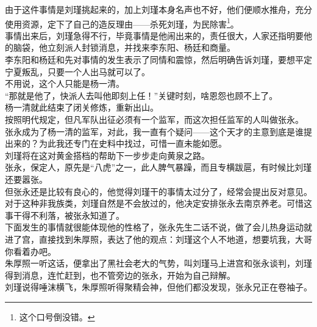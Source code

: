 \begin{multicols}{\theparacolNo}
由于这件事情是刘瑾挑起来的，加上刘瑾本身名声也不好，他们便顺水推舟，充分使用资源，定下了自己的造反理由——杀死刘瑾，为民除害\footnote{这个口号倒没错。}。\\

事情出来后，刘瑾急得不行，毕竟事情是他闹出来的，责任很大，人家还指明要他的脑袋，他立刻派人封锁消息，并找来李东阳、杨廷和商量。\\

李东阳和杨廷和先对事情的发生表示了同情和震惊，然后明确告诉刘瑾，要想平定宁夏叛乱，只要一个人出马就可以了。\\

不用说，这个人只能是杨一清。\\

“那就是他了，快派人去叫他即刻上任！”关键时刻，啥恩怨也顾不上了。\\

杨一清就此结束了闭关修炼，重新出山。\\

按照明代规定，但凡军队出征必须有一个监军，而这次担任监军的人叫做张永。\\

张永成为了杨一清的监军，对此，我一直有个疑问——这个天才的主意到底是谁提出来的？为此我还专门在史料中找过，可惜一直未能如愿。\\

刘瑾将在这对黄金搭档的帮助下一步步走向黄泉之路。\\

张永，保定人，原先是“八虎”之一，此人脾气暴躁，而且专横跋扈，有时候比刘瑾还要嚣张。\\

但张永还是比较有良心的，他觉得刘瑾干的事情太过分了，经常会提出反对意见。\\

对于这种非我族类，刘瑾自然是不会放过的，他决定安排张永去南京养老。可惜这事干得不利落，被张永知道了。\\

下面发生的事情就很能体现他的性格了，张永先生二话不说，做了会儿热身运动就进了宫，直接找到朱厚照，表达了他的观点：刘瑾这个人不地道，想要坑我，大哥你看着办吧。\\

朱厚照一听这话，便拿出了黑社会老大的气势，叫刘瑾马上进宫和张永谈判，刘瑾得到消息，连忙赶到，也不管旁边的张永，开始为自己辩解。\\

刘瑾说得唾沫横飞，朱厚照听得聚精会神，但他们都没发现，张永兄正在卷袖子。\\


\end{multicols}
